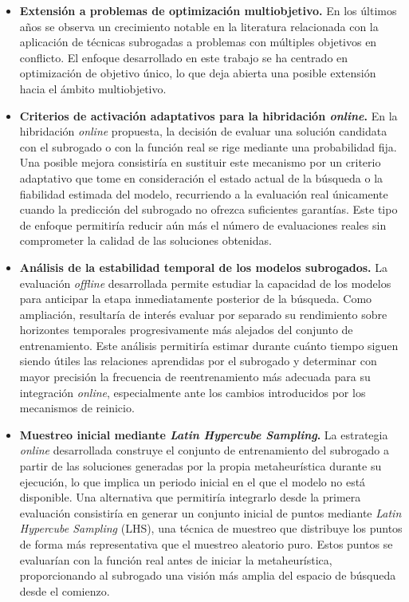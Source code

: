 \begin{itemize}

    \item \textbf{Extensión a problemas de optimización multiobjetivo.} En los últimos
          años se observa un crecimiento notable en la literatura relacionada con la aplicación
          de técnicas subrogadas a problemas con múltiples objetivos en conflicto. El
          enfoque desarrollado en este trabajo se ha centrado en optimización de objetivo único,
          lo que deja abierta una posible extensión hacia el ámbito multiobjetivo.

    \item \textbf{Criterios de activación adaptativos para la hibridación \textit{online}.}
          En la hibridación \textit{online} propuesta, la decisión de evaluar una solución
          candidata con el subrogado o con la función real se rige mediante una
          probabilidad fija. Una posible mejora consistiría en sustituir este mecanismo por
          un criterio adaptativo que tome en consideración el estado actual de la búsqueda o
          la fiabilidad estimada del modelo, recurriendo a la evaluación real únicamente cuando
          la predicción del subrogado no ofrezca suficientes garantías. Este tipo de
          enfoque permitiría reducir aún más el número de evaluaciones reales sin comprometer
          la calidad de las soluciones obtenidas.

    \item \textbf{Análisis de la estabilidad temporal de los modelos subrogados.}
          La evaluación \textit{offline} desarrollada permite estudiar la capacidad de los
          modelos para anticipar la etapa inmediatamente posterior de la búsqueda. Como
          ampliación, resultaría de interés evaluar por separado su rendimiento sobre
          horizontes temporales progresivamente más alejados del conjunto de entrenamiento.
          Este análisis permitiría estimar durante cuánto tiempo siguen siendo útiles las
          relaciones aprendidas por el subrogado y determinar con mayor precisión la
          frecuencia de reentrenamiento más adecuada para su integración \textit{online},
          especialmente ante los cambios introducidos por los mecanismos de reinicio.

    \item \textbf{Muestreo inicial mediante \textit{Latin Hypercube Sampling}.} La
          estrategia \textit{online} desarrollada construye el conjunto de entrenamiento del
          subrogado a partir de las soluciones generadas por la propia metaheurística
          durante su ejecución, lo que implica un periodo inicial en el que el modelo no está
          disponible. Una alternativa que permitiría integrarlo desde la primera evaluación
          consistiría en generar un conjunto inicial de puntos mediante \textit{Latin Hypercube
              Sampling} (LHS), una técnica de muestreo que distribuye los puntos de forma más
          representativa que el muestreo aleatorio puro. Estos puntos se evaluarían con la
          función real antes de iniciar la metaheurística, proporcionando al subrogado
          una visión más amplia del espacio de búsqueda desde el comienzo.

\end{itemize}
